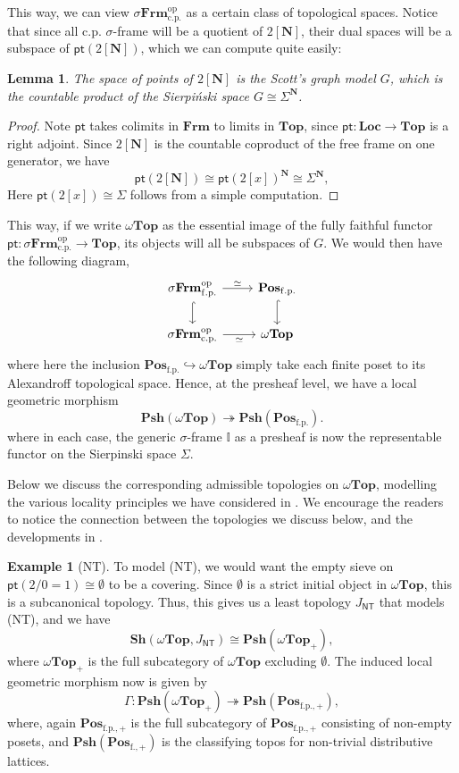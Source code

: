 \documentclass[12pt]{amsart}
\newtheorem{lemma}[theorem]{Lemma}
\theoremstyle{definition}
\newtheorem{example}[theorem]{Example}
\newcommand{\mb}[1]{\mathbf{#1}}
\newcommand{\mbb}[1]{\mathbb{#1}}
\newcommand{\I}{\mbb I}
\newcommand{\mr}[1]{\mathrm{#1}}
\newcommand{\ms}[1]{\mathsf{#1}}
\newcommand{\Pos}{\mb{Pos}}
\newcommand{\sh}{\mb{Sh}}
\newcommand{\psh}{\mb{Psh}}
\newcommand{\op}{^{\mathrm{op}}}
\newcommand{\surj}{\twoheadrightarrow}
\newcommand{\hook}{\hookrightarrow}
\newcommand{\fp}{_{\mr{f.p.}}}
\newcommand{\cp}{_{\mr{c.p.}}}
\newcommand{\N}{\mb N}
\newcommand{\emp}{\emptyset}
\newcommand{\pt}{\ms{pt}}
\newcommand{\sFrm}{\sigma\mb{Frm}}
\newcommand{\Frm}{\mb{Frm}}
\newcommand{\Loc}{\mb{Loc}}
\newcommand{\Topp}{\mb{Top}}
\newcommand{\wTop}{\omega\mb{Top}}
\begin{document}
This way, we can view $\sFrm\cp\op$ as a certain class of topological spaces. Notice that since all c.p. $\sigma$-frame will be a quotient of $2[\N]$, their dual spaces will be a subspace of $\pt(2[\N])$, which we can compute quite easily:

\begin{lemma}
  The space of points of $2[\N]$ is the Scott's graph model $G$, which is the countable product of the Sierpi\'nski space $G \cong \Sigma^\N$.
\end{lemma}
\begin{proof}
  Note $\pt$ takes colimits in $\Frm$ to limits in $\Topp$, since $\pt : \Loc \to \Topp$ is a right adjoint. Since $2[\N]$ is the countable coproduct of the free frame on one generator, we have
  \[ \pt(2[\N]) \cong \pt(2[x])^\N \cong \Sigma^\N, \]
  Here $\pt(2[x]) \cong \Sigma$ follows from a simple computation.
\end{proof}

This way, if we write $\wTop$ as the essential image of the fully faithful functor $\pt : \sFrm\cp\op \to \Topp$, its objects will all be subspaces of $G$. We would then have the following diagram,
\[
\begin{tikzcd}
  \sFrm\fp\op \ar[d, hook] \ar[r, "\simeq"] & \Pos\fp \ar[d, hook] \\
  \sFrm\cp\op \ar[r, "\simeq"'] & \wTop
\end{tikzcd}
\]
where here the inclusion $\Pos\fp \hook \wTop$ simply take each finite poset to its Alexandroff topological space. Hence, at the presheaf level, we have a local geometric morphism
\[ \psh(\wTop) \surj \psh(\Pos\fp). \]
where in each case, the generic $\sigma$-frame $\I$ as a presheaf is now the representable functor on the Sierpinski space $\Sigma$. 

Below we discuss the corresponding admissible topologies on $\wTop$, modelling the various locality principles we have considered in . We encourage the readers to notice the connection between the topologies we discuss below, and the developments in .

\begin{example}[NT]
  To model (NT), we would want the empty sieve on $\pt(2/0=1) \cong \emp$ to be a covering. Since $\emp$ is a strict initial object in $\wTop$, this is a subcanonical topology. Thus, this gives us a least topology $J_{\ms{NT}}$ that models (NT), and we have
  \[ \sh(\wTop,J_{\ms{NT}}) \cong \psh(\wTop_+), \]
  where $\wTop_+$ is the full subcategory of $\wTop$ excluding $\emp$. The induced local geometric morphism now is given by 
  \[ \Gamma : \psh(\wTop_+) \surj \psh(\Pos_{\mr{f.p.,+}}), \]
  where, again $\Pos_{\mr{f.p.,+}}$ is the full subcategory of $\Pos_{\mr{f.p.,+}}$ consisting of non-empty posets, and $\psh(\Pos_{\mr{f.,+}})$ is the classifying topos for non-trivial distributive lattices.
\end{example}
\end{document}
